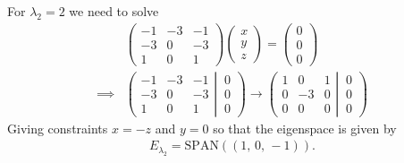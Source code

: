 {\noindent For $\lambda_2=2$ we need to solve
\begin{align*}
& \begin{pmatrix}
 -1 & -3 & -1 \\
 -3 &  0 & -3 \\
  1 &  0 &  1
\end{pmatrix}
\begin{pmatrix} x \\ y \\ z \end{pmatrix}
= 
\begin{pmatrix}
  0 \\
  0  \\
  0 
\end{pmatrix}
\\
\implies &
\left(
	\begin{matrix}
 -1 & -3 & -1 \\
 -3 &  0 & -3 \\
  1 &  0 &  1
	\end{matrix}
  \left| \, 
	\begin{matrix}
  0 \\
  0 \\
  0 
	\end{matrix}
  \right.
\right)
\to
\left(
	\begin{matrix}
  1 &  0 &  1 \\
  0 & -3 &  0 \\
  0 &  0 &  0
	\end{matrix}
  \left| \, 
	\begin{matrix}
	  0 \\
	  0 \\
	  0 
    \end{matrix}
  \right.
\right)
\end{align*}
Giving constraints $x=-z$ and $y=0$ so that the eigenspace is given by
\begin{align*}
E_{\lambda_2} = \text{SPAN}((1,\,0,\,-1)).
\end{align*}

}
